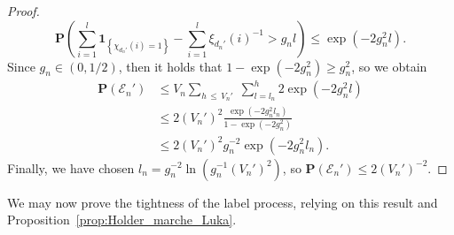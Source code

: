 \documentclass[AHL,Unicode,longabstracts,published]{cedram}
\newcommand{\ensembles}[1]{\mathbf{#1}}
\renewcommand{\P}{\ensembles{P}}
\renewcommand{\Pr}[1]{\P\left(#1\right)}
\newcommand{\1}{\ensembles{1}}
\renewcommand{\le}{\leqslant}
\renewcommand{\ge}{\geqslant}
\newcommand{\clE}{\mathcal{E}}
\newcommand{\vertices}{V}
\begin{document}
\begin{proof}
\[
\Pr{\sum_{i=1}^l \1_{\left\{\chi_{d_n'}(i) = 1\right\}} - \sum_{i=1}^l \xi_{d_n'}(i)^{-1} > g_nl}
\le \exp\left(- 2 g_n^2 l\right).
\]
Since $g_n \in (0,1/2)$, then it holds that $1 - \exp(- 2 g_n^2) \ge g_n^2$, so we obtain
\begin{align*}
\Pr{\clE_n'} &\le \vertices_n \sum_{h\,\le\,\vertices_n'}\; \sum_{l = l_n}^h 2 \exp\left(- 2 g_n^2 l\right)
\\
&\le 2 \left(\vertices_n'\right)^2 \frac{\exp\left(- 2 g_n^2 l_n\right)}{1 - \exp\left(- 2 g_n^2\right)}
\\
&\le 2 \left(\vertices_n'\right)^2 g_n^{-2} \exp\left(- 2 g_n^2 l_n\right).
\end{align*}
Finally, we have chosen $l_n = g_n^{-2} \ln(g_n^{-1} (\vertices_n')^2)$, so $\P(\clE_n')
\le 2 (\vertices_n')^{- 2}$.
\end{proof}



We may now prove the tightness of the label process, relying on this result and Proposition~\ref{prop:Holder_marche_Luka}.
\end{document}
